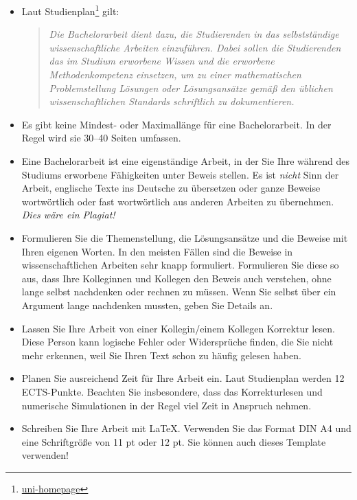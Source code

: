 \documentclass[a4paper,11pt,bibliography=totoc,listof=totoc,headinclude=true,cleardoublepage=empty,oneside]{scrbook}
\begin{document}
{\color{change}
\begin{itemize}

\item Laut Studienplan\footnote{\href{https://www.uni-hamburg.de/campuscenter/studienorganisation/ordnungen-satzungen/pruefungs-studienordnungen/mathematik-informatik-und-naturwissenschaften/20250521-fsb-min-bsc-mathe-55.pdf}{\ttfamily uni-homepage}}
gilt:
\begin{quote}\itshape
  Die Bachelorarbeit dient dazu, die Studierenden in das selbstständige wissenschaftliche Arbeiten einzuführen. Dabei sollen die Studierenden das im Studium erworbene Wissen und die erworbene Methodenkompetenz einsetzen, um zu einer mathematischen Problemstellung Lösungen oder Lösungsansätze gemäß den üblichen wissenschaftlichen Standards schriftlich zu dokumentieren.
\end{quote}

\item Es gibt keine Mindest- oder Maximallänge für eine Bachelorarbeit. In der Regel wird sie 30--40 Seiten umfassen.

\item Eine Bachelorarbeit ist eine eigenständige Arbeit, in der Sie Ihre während
des Studiums erworbene Fähigkeiten unter Beweis stellen. Es ist {\em nicht}
Sinn der Arbeit, englische Texte ins Deutsche zu übersetzen oder ganze
Beweise wortwörtlich oder fast wortwörtlich 
aus anderen Arbeiten zu übernehmen. {\em Dies wäre ein Plagiat!} 

\item Formulieren Sie die Themenstellung, die Lösungsansätze und die Beweise 
mit Ihren eigenen Worten. In den meisten Fällen sind die Beweise
in wissenschaftlichen Arbeiten sehr knapp formuliert. Formulieren Sie diese so
aus, dass Ihre Kolleginnen und Kollegen den Beweis auch verstehen, ohne lange selbst nachdenken
oder rechnen zu müssen. Wenn Sie selbst über ein Argument lange nachdenken mussten,
geben Sie Details an.

\item Lassen Sie Ihre Arbeit von einer Kollegin/einem Kollegen Korrektur lesen.
Diese Person kann logische Fehler oder Widersprüche finden, die Sie nicht mehr
erkennen, weil Sie Ihren Text schon zu häufig gelesen haben.

\item Planen Sie ausreichend Zeit für Ihre Arbeit ein. Laut Studienplan
werden 12 ECTS-Punkte. Beachten Sie insbesondere, dass das
Korrekturlesen und numerische Simulationen in der Regel viel Zeit in
Anspruch nehmen.

\item Schreiben Sie Ihre Arbeit mit \LaTeX. Verwenden Sie das Format DIN A4 und eine Schriftgröße von 11 pt
oder 12 pt. Sie können auch dieses Template verwenden!

\end{itemize}
}
\end{document}
